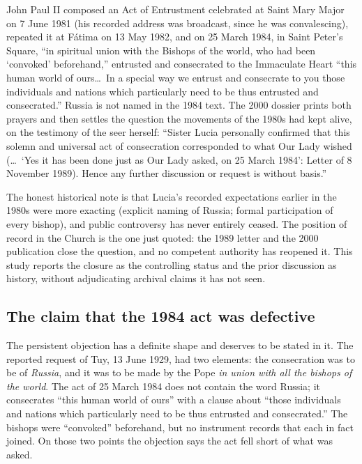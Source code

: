 John Paul II composed an Act of Entrustment celebrated at Saint Mary
Major on 7 June 1981 (his recorded address was broadcast, since he
was convalescing), repeated it at F\'atima on 13 May 1982, and on
25 March 1984, in Saint Peter's Square, ``in spiritual union with the
Bishops of the world, who had been `convoked' beforehand,'' entrusted
and consecrated to the Immaculate Heart ``this human world of
ours\ldots\ In a special way we entrust and consecrate to you those
individuals and nations which particularly need to be thus entrusted
and consecrated.'' Russia is not named in the 1984 text. The 2000
dossier prints both prayers and then settles the question the
movements of the 1980s had kept alive, on the testimony of the seer
herself: ``Sister Lucia personally confirmed that this solemn and
universal act of consecration corresponded to what Our Lady wished
(\ldots\ `Yes it has been done just as Our Lady asked, on 25 March
1984': Letter of 8 November 1989). Hence any further discussion or
request is without basis.''

The honest historical note is that Lucia's recorded expectations
earlier in the 1980s were more exacting (explicit naming of Russia;
formal participation of every bishop), and public controversy has
never entirely ceased. The position of record in the Church is the
one just quoted: the 1989 letter and the 2000 publication close the
question, and no competent authority has reopened it. This study
reports the closure as the controlling status and the prior
discussion as history, without adjudicating archival claims it has
not seen.

\subsection{The claim that the 1984 act was defective}

The persistent objection has a definite shape and deserves to be
stated in it. The reported request of Tuy, 13 June 1929, had two
elements: the consecration was to be of \emph{Russia}, and it was to
be made by the Pope \emph{in union with all the bishops of the
world}. The act of 25 March 1984 does not contain the word Russia; it
consecrates ``this human world of ours'' with a clause about ``those
individuals and nations which particularly need to be thus entrusted
and consecrated.'' The bishops were ``convoked'' beforehand, but no
instrument records that each in fact joined. On those two points the
objection says the act fell short of what was asked.

